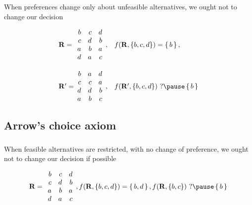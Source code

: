 \documentclass[french, english]{beamer}
\begin{document}
\begin{frame}[fragile]
	\frametitle{\subsecname}
	\begin{definition}[\subsecname]
		When preferences change only about unfeasible alternatives, we ought not to change our decision
	\end{definition}
	\vspace{-1.8pt}
	\begin{example}
		\begin{equation}
			\begin{array}{l@{\hskip 0in}ll}
				\prof =
				&\begin{array}{rrr}
					b	&	c	&	d\\
					c	&	d	&	b\\
					a	&	b	&	a\\
					d	&	a	&	c
				\end{array},
				& f(\prof, \{b, c, d\}) = \set{b},\\[3em]
				\prof' =
				&\begin{array}{rrr}
					b	&	a	&	d\\
					c	&	c	&	a\\
					d	&	d	&	b\\
					a	&	b	&	c
				\end{array},
				& f(\prof', \{b, c, d\})\text{ ?}
				\pause
				\set{b}
			\end{array}
		\end{equation}
	\end{example}
\end{frame}

\subsection[ACA]{Arrow’s choice axiom}
\begin{frame}
	\frametitle{\subsecname}
	\begin{definition}[\subsecname]
		When feasible alternatives are restricted, with no change of preference, we ought not to change our decision if possible
	\end{definition}
	\vspace{-1.8pt}
	\begin{example}
		\begin{equation}
			\prof =
			\begin{array}{rrr}
				b	&	c	&	d\\
				c	&	d	&	b\\
				a	&	b	&	a\\
				d	&	a	&	c
			\end{array},
			f(\prof, \{b, c, d\}) = \set{b, d},
			f(\prof, \{b, c\})\text{ ?}
			\pause
			\set{b}
		\end{equation}
	\end{example}
\end{frame}
\end{document}
